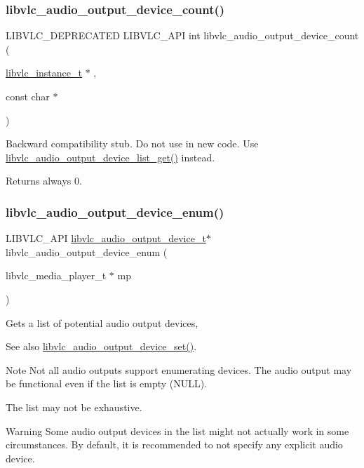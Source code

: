 \subsubsection{\texorpdfstring{libvlc\+\_\+audio\+\_\+output\+\_\+device\+\_\+count()}{libvlc\_audio\_output\_device\_count()}}
{\footnotesize\ttfamily L\+I\+B\+V\+L\+C\+\_\+\+D\+E\+P\+R\+E\+C\+A\+T\+ED L\+I\+B\+V\+L\+C\+\_\+\+A\+PI int libvlc\+\_\+audio\+\_\+output\+\_\+device\+\_\+count (\begin{DoxyParamCaption}\item[{\hyperlink{group__libvlc__core_ga316d739a80da4678206c79f4d6c2e284}{libvlc\+\_\+instance\+\_\+t} $\ast$}]{,  }\item[{const char $\ast$}]{ }\end{DoxyParamCaption})}

Backward compatibility stub. Do not use in new code. Use \hyperlink{group__libvlc__audio_ga4f94073a71cd9ee6641ce9bbbfdaf5f3}{libvlc\+\_\+audio\+\_\+output\+\_\+device\+\_\+list\+\_\+get()} instead. \begin{DoxyReturn}{Returns}
always 0. 
\end{DoxyReturn}
\mbox{\label{group__libvlc__audio_ga5d13bb70351f6fa597d8f1b553da81d5}} 
\subsubsection{\texorpdfstring{libvlc\+\_\+audio\+\_\+output\+\_\+device\+\_\+enum()}{libvlc\_audio\_output\_device\_enum()}}
{\footnotesize\ttfamily L\+I\+B\+V\+L\+C\+\_\+\+A\+PI \hyperlink{structlibvlc__audio__output__device__t}{libvlc\+\_\+audio\+\_\+output\+\_\+device\+\_\+t}$\ast$ libvlc\+\_\+audio\+\_\+output\+\_\+device\+\_\+enum (\begin{DoxyParamCaption}\item[{libvlc\+\_\+media\+\_\+player\+\_\+t $\ast$}]{mp }\end{DoxyParamCaption})}

Gets a list of potential audio output devices, \begin{DoxySeeAlso}{See also}
\hyperlink{group__libvlc__audio_ga4553bc34b90313e6592ad1af0067f31d}{libvlc\+\_\+audio\+\_\+output\+\_\+device\+\_\+set()}.
\end{DoxySeeAlso}
\begin{DoxyNote}{Note}
Not all audio outputs support enumerating devices. The audio output may be functional even if the list is empty (N\+U\+LL).

The list may not be exhaustive.
\end{DoxyNote}
\begin{DoxyWarning}{Warning}
Some audio output devices in the list might not actually work in some circumstances. By default, it is recommended to not specify any explicit audio device.
\end{DoxyWarning}


